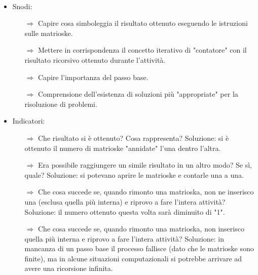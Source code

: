 \paragraph{}

\begin{itemize}
    \item Snodi:
    \begin{itemize}
        \item [$\Rightarrow$] Capire cosa simboleggia il risultato ottenuto eseguendo le istruzioni sulle matrioske.
        \item [$\Rightarrow$] Mettere in corrispondenza il concetto iterativo di "contatore" con il risultato
        ricorsivo ottenuto durante l'attività.
        \item [$\Rightarrow$] Capire l'importanza del passo base.
        \item [$\Rightarrow$] Comprensione dell'esistenza di soluzioni più "appropriate" per la risoluzione di problemi.
    \end{itemize}
    \item Indicatori:
    \begin{itemize}
        \item [$\Rightarrow$] Che risultato si è ottenuto? Cosa rappresenta? Soluzione: si è ottenuto il numero di matrioske "annidate" l'una dentro l'altra.
        \item [$\Rightarrow$] Era possibile raggiungere un simile risultato in un altro modo? Se sì, quale? Soluzione: si potevano aprire le matrioske e contarle una a una.
        \item [$\Rightarrow$] Che cosa succede se, quando rimonto una matrioska, non ne inserisco una (esclusa quella più interna) e riprovo a fare l'intera attività? Soluzione: il numero ottenuto questa volta sarà diminuito di "1".
        \item [$\Rightarrow$] Che cosa succede se, quando rimonto una matrioska, non inserisco quella più interna e riprovo a fare l'intera attività? Soluzione: in mancanza di un passo base il processo fallisce (dato che le matrioske sono finite),
         ma in alcune situazioni computazionali si potrebbe arrivare ad avere una ricorsione infinita. 
    \end{itemize}
\end{itemize}

\paragraph{}

